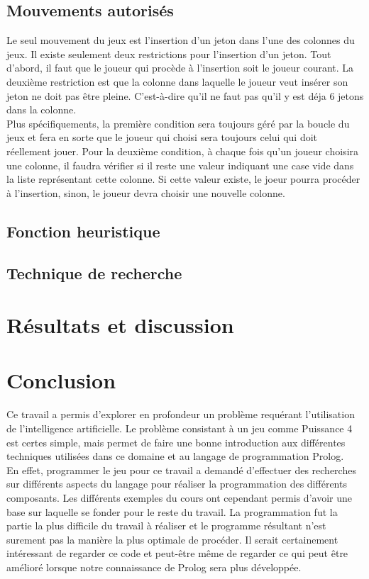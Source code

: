 \documentclass[12pt]{article}
\begin{document}
\subsection*{Mouvements autorisés}
Le seul mouvement du jeux est l'insertion d'un jeton dans l'une des colonnes du jeux. Il existe seulement deux restrictions pour l'insertion d'un jeton. Tout d'abord, il faut que le joueur qui procède à l'insertion soit le joueur courant. La deuxième restriction est que la colonne dans laquelle le joueur veut insérer son jeton ne doit pas être pleine. C'est-à-dire qu'il ne faut pas qu'il y est déja 6 jetons dans la colonne. \\

Plus spécifiquements, la première condition sera toujours géré par la boucle du jeux  et fera en sorte que le joueur qui choisi sera toujours celui qui doit réellement jouer. Pour la deuxième condition, à chaque fois qu'un joueur choisira une colonne, il faudra vérifier si il reste une valeur indiquant une case vide dans la liste représentant cette colonne. Si cette valeur existe, le joeur pourra procéder à l'insertion, sinon, le joueur devra choisir une nouvelle colonne.

\subsection*{Fonction heuristique}


\subsection*{Technique de recherche}


\section*{Résultats et discussion}


\section*{Conclusion}
Ce travail a permis d’explorer en profondeur un problème requérant l’utilisation de l’intelligence artificielle. Le problème consistant à un jeu comme Puissance 4 est certes simple, mais permet de faire une bonne introduction aux différentes techniques utilisées dans ce domaine et au langage de programmation Prolog.\\

En effet, programmer le jeu pour ce travail a demandé d’effectuer des recherches sur différents aspects du langage pour réaliser la programmation des différents composants. Les différents exemples du cours ont cependant permis d’avoir une base sur laquelle se fonder pour le reste du travail. La programmation fut la partie la plus difficile du travail à réaliser et le programme résultant n’est surement pas la manière la plus optimale de procéder. Il serait certainement intéressant de regarder ce code et peut-être même de regarder ce qui peut être amélioré lorsque notre connaissance de Prolog sera plus développée. \\
\end{document}
